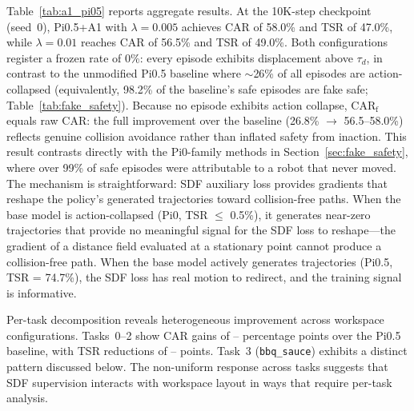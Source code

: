 Table~\ref{tab:a1_pi05} reports aggregate results. At the 10K-step checkpoint (seed~0), Pi0.5+A1 with $\lambda = 0.005$ achieves CAR of 58.0\% and TSR of 47.0\%, while $\lambda = 0.01$ reaches CAR of 56.5\% and TSR of 49.0\%. Both configurations register a frozen rate of 0\%: every episode exhibits displacement above $\tau_d$, in contrast to the unmodified Pi0.5 baseline where ${\sim}$26\% of all episodes are action-collapsed (equivalently, 98.2\% of the baseline's safe episodes are fake safe; Table~\ref{tab:fake_safety}). Because no episode exhibits action collapse, CAR$_\text{f}$ equals raw CAR: the full improvement over the baseline (26.8\% $\to$ 56.5--58.0\%) reflects genuine collision avoidance rather than inflated safety from inaction. This result contrasts directly with the Pi0-family methods in Section~\ref{sec:fake_safety}, where over 99\% of safe episodes were attributable to a robot that never moved. The mechanism is straightforward: SDF auxiliary loss provides gradients that reshape the policy's generated trajectories toward collision-free paths. When the base model is action-collapsed (Pi0, TSR $\leq$ 0.5\%), it generates near-zero trajectories that provide no meaningful signal for the SDF loss to reshape---the gradient of a distance field evaluated at a stationary point cannot produce a collision-free path. When the base model actively generates trajectories (Pi0.5, TSR = 74.7\%), the SDF loss has real motion to redirect, and the training signal is informative.

Per-task decomposition reveals heterogeneous improvement across workspace configurations. Tasks~0--2 show CAR gains of -- percentage points over the Pi0.5 baseline, with TSR reductions of -- points. Task~3 (\texttt{bbq\_sauce}) exhibits a distinct pattern discussed below. The non-uniform response across tasks suggests that SDF supervision interacts with workspace layout in ways that require per-task analysis.

